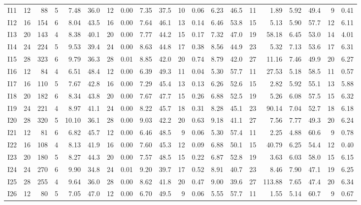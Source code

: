 \begin{landscape}
\begin{table}[p]
{\begin{tabular}{lrrr*{4}{rrrr}}
I11 & 12 & 88 & 5 & 7.48 & 36.0 & 12 & 0.00 & 7.35 & 37.5 & 10 & 0.06 & 6.23 & 46.5 & 11 & 1.89 & 5.92 & 49.4 & 9 & 0.41 \\
I12 & 16 & 154 & 6 & 8.04 & 43.5 & 16 & 0.00 & 7.64 & 46.1 & 13 & 0.14 & 6.46 & 53.8 & 15 & 5.13 & 5.90 & 57.7 & 12 & 6.11 \\
I13 & 20 & 143 & 4 & 8.38 & 40.1 & 20 & 0.00 & 7.77 & 44.2 & 15 & 0.17 & 7.32 & 47.0 & 19 & 58.18 & 6.45 & 53.0 & 14 & 4.01 \\
I14 & 24 & 224 & 5 & 9.53 & 39.4 & 24 & 0.00 & 8.63 & 44.8 & 17 & 0.38 & 8.56 & 44.9 & 23 & 5.32 & 7.13 & 53.6 & 17 & 6.31 \\
I15 & 28 & 323 & 6 & 9.79 & 36.3 & 28 & 0.01 & 8.85 & 42.0 & 20 & 0.74 & 8.79 & 42.0 & 27 & 11.16 & 7.46 & 49.9 & 20 & 6.27 \\
I16 & 12 & 84 & 4 & 6.51 & 48.4 & 12 & 0.00 & 6.39 & 49.3 & 11 & 0.04 & 5.30 & 57.7 & 11 & 27.53 & 5.18 & 58.5 & 11 & 0.57 \\
I17 & 16 & 110 & 5 & 7.67 & 42.8 & 16 & 0.00 & 7.29 & 45.4 & 13 & 0.13 & 6.26 & 52.6 & 15 & 2.82 & 5.92 & 55.1 & 13 & 5.88 \\
I18 & 20 & 182 & 6 & 8.34 & 43.8 & 20 & 0.00 & 7.67 & 47.7 & 15 & 0.26 & 6.88 & 52.5 & 19 & 5.26 & 6.08 & 57.5 & 15 & 6.32 \\
I19 & 24 & 221 & 4 & 8.97 & 41.1 & 24 & 0.00 & 8.22 & 45.7 & 18 & 0.31 & 8.28 & 45.1 & 23 & 90.14 & 7.04 & 52.7 & 18 & 6.18 \\
I20 & 28 & 320 & 5 & 10.10 & 36.1 & 28 & 0.00 & 9.03 & 42.2 & 20 & 0.63 & 9.18 & 41.1 & 27 & 7.56 & 7.77 & 49.3 & 20 & 6.24 \\
I21 & 12 & 81 & 6 & 6.82 & 45.7 & 12 & 0.00 & 6.46 & 48.5 & 9 & 0.06 & 5.30 & 57.4 & 11 & 2.25 & 4.88 & 60.6 & 9 & 0.78 \\
I22 & 16 & 108 & 4 & 8.13 & 41.9 & 16 & 0.00 & 7.60 & 45.3 & 12 & 0.09 & 6.88 & 50.1 & 15 & 40.79 & 6.25 & 54.4 & 12 & 0.40 \\
I23 & 20 & 180 & 5 & 8.27 & 44.3 & 20 & 0.00 & 7.57 & 48.5 & 15 & 0.22 & 6.87 & 52.8 & 19 & 3.63 & 6.03 & 58.0 & 15 & 6.15 \\
I24 & 24 & 270 & 6 & 9.90 & 34.8 & 24 & 0.01 & 9.20 & 39.7 & 17 & 0.52 & 8.91 & 40.7 & 23 & 8.46 & 7.90 & 47.1 & 19 & 6.25 \\
I25 & 28 & 255 & 4 & 9.64 & 36.0 & 28 & 0.00 & 8.62 & 41.8 & 20 & 0.47 & 9.00 & 39.6 & 27 & 113.88 & 7.65 & 47.4 & 20 & 6.34 \\
I26 & 12 & 80 & 5 & 7.05 & 47.0 & 12 & 0.00 & 6.70 & 49.5 & 9 & 0.06 & 5.55 & 57.7 & 11 & 1.55 & 5.14 & 60.7 & 9 & 0.67 \\

\end{tabular}}
\end{table}
\end{landscape}
